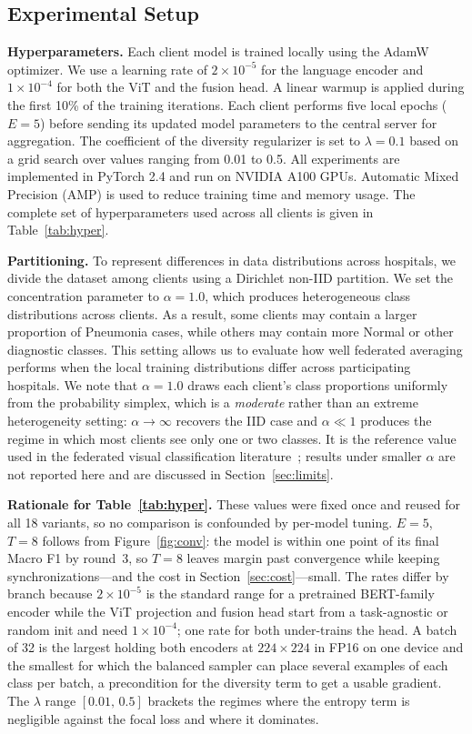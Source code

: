 \documentclass[letterpaper, conference]{IEEEtran}
\begin{document}
\subsection{Experimental Setup}

\textbf{Hyperparameters.}
Each client model is trained locally using the AdamW optimizer. We use a learning rate of $2{\times}10^{-5}$ for the language encoder and $1{\times}10^{-4}$ for both the ViT and the fusion head. A linear warmup is applied during the first 10\% of the training iterations. Each client performs five local epochs ($E=5$) before sending its updated model parameters to the central server for aggregation. The coefficient of the diversity regularizer is set to $\lambda=0.1$ based on a grid search over values ranging from 0.01 to 0.5. All experiments are implemented in PyTorch 2.4 and run on NVIDIA A100 GPUs. Automatic Mixed Precision (AMP) is used to reduce training time and memory usage. The complete set of hyperparameters used across all clients is given in Table~\ref{tab:hyper}.

\textbf{Partitioning.}
To represent differences in data distributions across hospitals, we divide the dataset among clients using a Dirichlet non-IID partition. We set the concentration parameter to $\alpha=1.0$, which produces heterogeneous class distributions across clients. As a result, some clients may contain a larger proportion of Pneumonia cases, while others may contain more Normal or other diagnostic classes. This setting allows us to evaluate how well federated averaging performs when the local training distributions differ across participating hospitals. We note that $\alpha=1.0$ draws each client's class proportions uniformly from the probability simplex, which is a \emph{moderate} rather than an extreme heterogeneity setting: $\alpha\!\to\!\infty$ recovers the IID case and $\alpha\!\ll\!1$ produces the regime in which most clients see only one or two classes. It is the reference value used in the federated visual classification literature~\cite{Hsu2019}; results under smaller $\alpha$ are not reported here and are discussed in Section~\ref{sec:limits}.

\textbf{Rationale for Table~\ref{tab:hyper}.}
These values were fixed once and reused for all 18 variants, so no comparison is confounded by per-model tuning. $E{=}5$, $T{=}8$ follows from Figure~\ref{fig:conv}: the model is within one point of its final Macro F1 by round~3, so $T{=}8$ leaves margin past convergence while keeping synchronizations---and the cost in Section~\ref{sec:cost}---small. The rates differ by branch because $2{\times}10^{-5}$ is the standard range for a pretrained BERT-family encoder while the ViT projection and fusion head start from a task-agnostic or random init and need $1{\times}10^{-4}$; one rate for both under-trains the head. A batch of 32 is the largest holding both encoders at $224{\times}224$ in FP16 on one device and the smallest for which the balanced sampler can place several examples of each class per batch, a precondition for the diversity term to get a usable gradient. The $\lambda$ range $[0.01,\,0.5]$ brackets the regimes where the entropy term is negligible against the focal loss and where it dominates.
\end{document}
